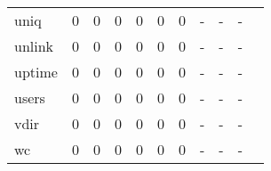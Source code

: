 \begin{longtable}{lp{1.20cm}p{1.20cm}p{1.20cm}p{1.20cm}p{1.20cm}p{1.20cm}p{1.20cm}p{1.20cm}p{1.20cm}p{1.20cm}}
uniq      &                                     0 &                                                  0 &                                                  0 &                                                  0 &                                                  0 &                                                  0 &                                             - &                                                  - &                                                  - \\
unlink    &                                     0 &                                                  0 &                                                  0 &                                                  0 &                                                  0 &                                                  0 &                                             - &                                                  - &                                                  - \\
uptime    &                                     0 &                                                  0 &                                                  0 &                                                  0 &                                                  0 &                                                  0 &                                             - &                                                  - &                                                  - \\
users     &                                     0 &                                                  0 &                                                  0 &                                                  0 &                                                  0 &                                                  0 &                                             - &                                                  - &                                                  - \\
vdir      &                                     0 &                                                  0 &                                                  0 &                                                  0 &                                                  0 &                                                  0 &                                             - &                                                  - &                                                  - \\
wc        &                                     0 &                                                  0 &                                                  0 &                                                  0 &                                                  0 &                                                  0 &                                             - &                                                  - &                                                  - \\

\end{longtable}
